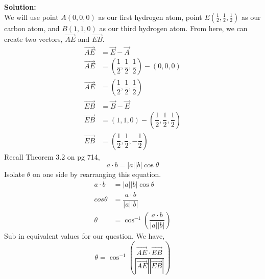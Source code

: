 \documentclass[12pt]{book}
\begin{document}
\begin{enumerate}
\setcounter{equation}{0}
\textbf{Solution:}\\
We will use point $A(0,0,0)$ as our first hydrogen atom, point $E\left(\frac{1}{2},\frac{1}{2},\frac{1}{2}\right)$ as our carbon atom, and $B(1,1,0)$ as our third hydrogen atom. From here, we can create two vectors, $\vec{AE}$ and $\vec{EB}$.
\begin{align}
    \vec{AE} &= \vec{E} - \vec{A} \\
    \vec{AE} &= \left(\dfrac{1}{2}, \dfrac{1}{2}, \dfrac{1}{2}\right) - (0,0,0) \\
    \vec{AE} &= \left(\dfrac{1}{2}, \dfrac{1}{2}, \dfrac{1}{2}\right)
\end{align}
\begin{align}
    \vec{EB} &= \vec{B} - \vec{E} \\
    \vec{EB} &= (1,1,0) - \left(\dfrac{1}{2}, \dfrac{1}{2}, \dfrac{1}{2}\right) \\
    \vec{EB} &= \left(\dfrac{1}{2}, \dfrac{1}{2}, -\dfrac{1}{2}\right)
\end{align}
Recall Theorem 3.2 on pg 714,
$$a\cdot b = |a||b|\cos\theta$$
Isolate $\theta$ on one side by rearranging this equation.
\begin{align}
    a\cdot b &= |a||b|\cos\theta \\
    cos\theta &= \dfrac{a \cdot b}{|a||b|} \\
    \theta &= \cos^{-1}\left(\dfrac{a \cdot b}{|a||b|}\right)
\end{align}
Sub in equivalent values for our question. We have,
$$\theta = \cos^{-1}\left(\dfrac{\vec{AE} \cdot \vec{EB}}{|\vec{AE}||\vec{EB}|}\right)$$



\end{enumerate}
\end{document}
